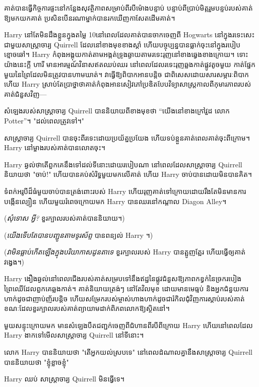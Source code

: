 គាត់​បាន​ធ្វើ​កិច្ចការ​ផ្ទះ​នៅ​កន្លែង​សុវត្ថិភាព​សម្រាប់​ពីរ​បី​ម៉ោង​បន្ទាប់ បន្ទាប់​ពី​ប្រាប់​មិត្ត​រួម​បន្ទប់​របស់​គាត់​ឱ្យ​មក​យក​គាត់ ប្រសិន​បើ​នរណា​ម្នាក់​បាន​រក​ឃើញ​កាសែត​ដើម​គាត់។

Harry នៅតែមិនដឹងខ្លួនក្នុងតម្លៃ 10\am នៅពេលដែលគាត់បានចាកចេញពី Hogwarts នៅក្នុងរទេះសេះជាមួយសាស្រ្តាចារ្យ Quirrell ដែលនៅខាងមុខខាងស្តាំ ហើយបច្ចុប្បន្នបានធ្លាក់ចុះនៅក្នុងរបៀបខ្មោចឆៅ។ Harry កំពុង​អង្គុយ​កាត់​តាម​អង្កត់ទ្រូង​ឆ្ងាយ​តាម​រទេះ​រុញ​នៅ​ខាង​ឆ្វេង​ខាង​ក្រោយ។ ទោះយ៉ាងនេះក្តី ហារី មានអារម្មណ៍វិនាសឥតឈប់ឈរ នៅពេលដែលរទេះរុញឆ្លងកាត់ផ្លូវតូចមួយ កាត់ផ្នែកមួយនៃព្រៃដែលមិនត្រូវបានហាមឃាត់។ វាធ្វើឱ្យពិបាកអានបន្តិច ជាពិសេសដោយសារសម្ភារៈពិបាក ហើយ Harry ស្រាប់តែប្រាថ្នាថាគាត់កំពុងអានសៀវភៅប្រឌិតបែបវិទ្យាសាស្ត្រកាលពីកុមារភាពរបស់គាត់ជំនួសវិញ—

សំឡេង​របស់​សាស្ត្រាចារ្យ Quirrell បាន​និយាយ​ពី​ខាង​មុខ​ថា “យើង​នៅ​ខាង​ក្រៅ​វួដ លោក ~ Potter”។ "ដល់ពេលត្រូវទៅ។"

សាស្ត្រាចារ្យ Quirrell បានចុះពីរទេះដោយប្រយ័ត្នប្រយែង ហើយទប់ខ្លួនគាត់ពេលគាត់ចុះពីក្រោម។ Harry នៅម្ខាងរបស់គាត់បានលោតចុះ។

Harry ឆ្ងល់ថាតើពួកគេនឹងទៅដល់ទីនោះដោយរបៀបណា នៅពេលដែលសាស្រ្តាចារ្យ Quirrell និយាយថា "ចាប់!" ហើយ​បាន​គប់​សំរិទ្ធ​មួយ​មក​លើ​គាត់ ហើយ Harry ចាប់​បាន​ដោយ​មិន​បាន​គិត។

ទំពក់​អរូបី​ដ៏​ធំ​មួយ​ចាប់​បាន​ត្រង់​ពោះ​របស់ Harry ហើយ​រុញ​គាត់​ទៅ​ក្រោយ​ដោយ​រឹង​តែ​មិន​មាន​ការ​បង្កើនល្បឿន ហើយ​មួយ​រំពេច​ក្រោយ​មក Harry បាន​ឈរ​នៅ​កណ្តាល Diagon Alley។

(\emph{សុំទោស អ្វី?} ខួរក្បាលរបស់គាត់បាននិយាយ។)

(\emph{យើង​ទើប​តែ​បាន​បញ្ជូន​តាម​ទូរស័ព្ទ} បាន​ពន្យល់ Harry ។)

(\emph{វា​មិន​ធ្លាប់​កើត​ឡើង​ក្នុង​បរិយាកាស​ដូនតា​ទេ} ខួរក្បាល​របស់ Harry បាន​ត្អូញត្អែរ ហើយ​ធ្វើ​ឲ្យ​គាត់​វង្វេង។)

Harry ងឿងឆ្ងល់នៅពេលជើងរបស់គាត់សម្របទៅនឹងឥដ្ឋនៃផ្លូវជំនួសឱ្យភាពកខ្វក់នៃច្រករបៀងព្រៃឈើដែលពួកគេឆ្លងកាត់។ គាត់និយាយត្រង់ៗ នៅតែវិលមុខ ដោយមានមេធ្មប់ និងអ្នកជំនួយការហាក់ដូចជាញាប់ញ័របន្តិច ហើយសម្រែករបស់ម្ចាស់ហាងហាក់ដូចជារំកិលជុំវិញការស្តាប់របស់គាត់ ខណៈដែលខួរក្បាលរបស់គាត់ព្យាយាមដាក់ពិភពលោកឱ្យស្ថិតនៅ។

មួយសន្ទុះក្រោយមក មានសំឡេងបឺតជញ្ជក់ចេញពីជំហានពីរបីពីក្រោយ Harry ហើយនៅពេលដែល Harry ងាកទៅមើលសាស្រ្តាចារ្យ Quirrell នៅទីនោះ។

លោក Harry បាននិយាយថា "តើអ្នកយល់ស្របទេ" នៅពេលដំណាលគ្នានឹងសាស្រ្តាចារ្យ Quirrell បាននិយាយថា "ខ្ញុំខ្លាចខ្ញុំ"

Harry ឈប់ សាស្ត្រាចារ្យ Quirrell មិនធ្វើទេ។


